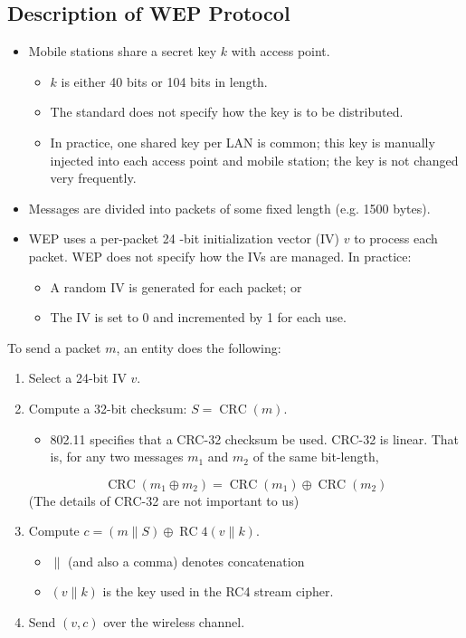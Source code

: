 \subsection*{Description of WEP Protocol}
\begin{itemize}
      \item Mobile stations share a secret key $k$ with access point.
            \begin{itemize}
                  \item $k$ is either 40 bits or 104 bits in length.
                  \item The standard does not specify how the key is to be distributed.
                  \item In practice, one shared key per LAN is common; this key is manually injected
                        into each access point and mobile station; the key is not changed very frequently.
            \end{itemize}
      \item Messages are divided into packets of some fixed length (e.g. 1500 bytes).
      \item WEP uses a per-packet 24 -bit initialization vector (IV) $v$ to process each packet. WEP does not specify how the IVs are managed. In practice:
            \begin{itemize}
                  \item A random IV is generated for each packet; or
                  \item  The IV is set to 0 and incremented by 1 for each use.
            \end{itemize}
\end{itemize}
To send a packet $m$, an entity does the following:
\begin{enumerate}
      \item Select a 24-bit IV $v$.
      \item Compute a 32-bit checksum: $S=\operatorname{CRC}(m)$.
            \begin{itemize}
                  \item 802.11 specifies that a CRC-32 checksum be used. CRC-32 is linear.
                        That is, for any two messages $m_{1}$ and $m_{2}$ of the same
                        bit-length,
            \end{itemize}
            \[
                  \operatorname{CRC}\left(m_{1} \oplus m_{2}\right)=\operatorname{CRC}\left(m_{1}\right) \oplus \operatorname{CRC}\left(m_{2}\right)
            \]
            (The details of CRC-32 are not important to us)
      \item Compute $c=(m \| S) \oplus \operatorname{RC} 4(v \| k)$.
            \begin{itemize}
                  \item $\|$ (and also a comma) denotes concatenation
                  \item $(v \| k)$ is the key used in the RC4 stream cipher.
            \end{itemize}
      \item Send $(v, c)$ over the wireless channel.
\end{enumerate}


